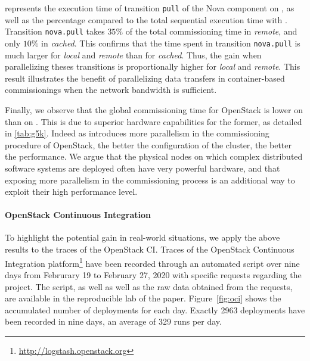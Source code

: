  represents the execution time of
transition \texttt{pull} of the Nova component on \ecotype, as well as
the percentage compared to the total sequential execution time with
\madass. Transition \texttt{nova.pull} takes $35\%$ of the total
commissioning time in \emph{remote}, and only $10\%$ in
\emph{cached}. This confirms that the time spent in
transition \texttt{nova.pull} is much larger for \emph{local} and
\emph{remote} than for \emph{cached}. Thus, the gain
when parallelizing theses transitions is proportionally higher for
\emph{local} and \emph{remote}. This result illustrates the benefit
of parallelizing data transfers in container-based commissionings when
the network bandwidth is sufficient.

Finally, we observe that the global commissioning time for OpenStack
is lower on \ecotype than on \nova. This is due to superior hardware
capabilities for the former, as detailed in \cref{tab:g5k}. Indeed
as \mad introduces more parallelism in the commissioning procedure of
OpenStack, the better the configuration of the cluster, the better the
performance. We argue that the physical nodes on which complex
distributed software systems are deployed often have very powerful
hardware, and that exposing more parallelism in the
commissioning process is an additional way to exploit their high
performance level.


\paragraph{OpenStack Continuous Integration}

To highlight the potential gain in real-world situations, we apply the
above results to the traces of the OpenStack CI. Traces of the
OpenStack Continuous Integration
platform\footnote{\url{http://logstash.openstack.org}} have been
recorded through an automated \python script over nine days from
Februrary 19 to February 27, 2020 with specific requests regarding
the \kolla project. The script, as well as well as the raw data
obtained from the requests, are available in the reproducible lab of
the paper. Figure~\ref{fig:oci} shows the accumulated number of \kolla
deployments for each day. Exactly 2963 deployments have been recorded
in nine days, an average of 329 runs per day.


